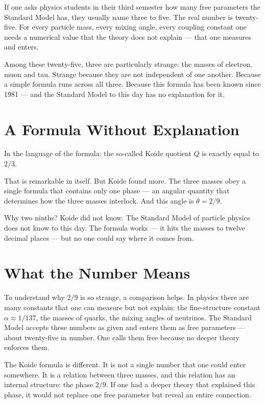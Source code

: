 \documentclass[12pt,oneside]{book}
\begin{document}
If one asks physics students in their third semester how many free parameters the Standard Model has, they usually name three to five. The real number is twenty-five. For every particle mass, every mixing angle, every coupling constant one needs a numerical value that the theory does not explain --- that one measures and enters.

Among these twenty-five, three are particularly strange: the masses of electron, muon and tau. Strange because they are not independent of one another. Because a simple formula runs across all three. Because this formula has been known since 1981 --- and the Standard Model to this day has no explanation for it.

\section{A Formula Without Explanation}

In the language of the formula: the so-called Koide quotient $Q$ is exactly equal to $2/3$.

That is remarkable in itself. But Koide found more. The three masses obey a single formula that contains only one phase --- an angular quantity that determines how the three masses interlock. And this angle is $\theta = 2/9$.

Why two ninths? Koide did not know. The Standard Model of particle physics does not know to this day. The formula works --- it hits the masses to twelve decimal places --- but no one could say where it comes from.

\section{What the Number Means}

To understand why $2/9$ is so strange, a comparison helps. In physics there are many constants that one can measure but not explain: the fine-structure constant $\alpha \approx 1/137$, the masses of quarks, the mixing angles of neutrinos. The Standard Model accepts these numbers as given and enters them as free parameters --- about twenty-five in number. One calls them free because no deeper theory enforces them.

The Koide formula is different. It is not a single number that one could enter somewhere. It is a relation between three masses, and this relation has an internal structure: the phase $2/9$. If one had a deeper theory that explained this phase, it would not replace one free parameter but reveal an entire connection.
\end{document}
